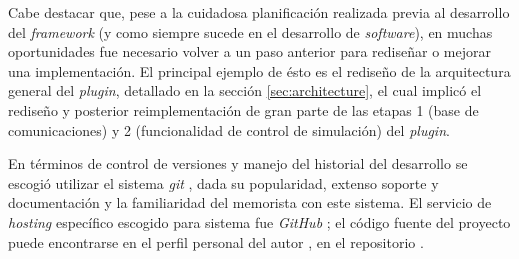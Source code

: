 Cabe destacar que, pese a la cuidadosa planificación realizada previa al desarrollo del \emph{framework} (y como siempre sucede en el desarrollo de \emph{software}), en muchas oportunidades fue necesario volver a un paso anterior para rediseñar o mejorar una implementación. El principal ejemplo de ésto es el rediseño de la arquitectura general del \emph{plugin}, detallado en la sección \ref{sec:architecture}, el cual implicó el rediseño y posterior reimplementación de gran parte de las etapas 1 (base de comunicaciones) y 2 (funcionalidad de control de simulación) del \emph{plugin}.

En términos de control de versiones y manejo del historial del desarrollo se escogió utilizar el sistema \emph{git} \autocite{git}, dada su popularidad, extenso soporte y documentación y la familiaridad del memorista con este sistema. El servicio de \emph{hosting} específico escogido para sistema fue \emph{GitHub} \autocite{github}; el código fuente del proyecto puede encontrarse en el perfil personal del autor \autocite{molguin_github}, en el repositorio \autocite{pveins_github}.